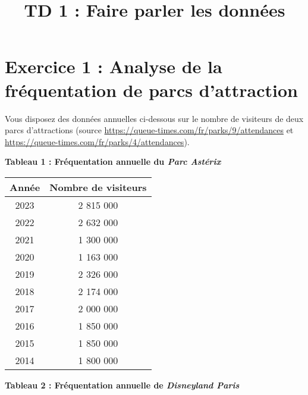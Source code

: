 \documentclass[a4paper,11pt]{article}
\title{TD 1 : Faire parler les données}
\author{}
\date{}
\begin{document}
\maketitle

\section*{Exercice 1 : Analyse de la fréquentation de parcs d'attraction}

Vous disposez des données annuelles ci-dessous sur le nombre de visiteurs de deux parcs d'attractions (source \url{https://queue-times.com/fr/parks/9/attendances} et \url{https://queue-times.com/fr/parks/4/attendances}).


\begin{center}
\textbf{Tableau 1 : Fréquentation annuelle du \textit{Parc Astérix}}\\

\vspace{.2cm}

\begin{tabular}{c|c}
Année & Nombre de visiteurs \\
\hline
2023 & 2 815 000 \\
2022 & 2 632 000 \\
2021 & 1 300 000 \\
2020 & 1 163 000 \\
2019 & 2 326 000 \\
2018 & 2 174 000 \\
2017 & 2 000 000 \\
2016 & 1 850 000 \\
2015 & 1 850 000 \\
2014 & 1 800 000 \\
\end{tabular}

\vspace{1cm}

\textbf{Tableau 2 : Fréquentation annuelle de \textit{Disneyland Paris}}\\


\end{center}
\end{document}
